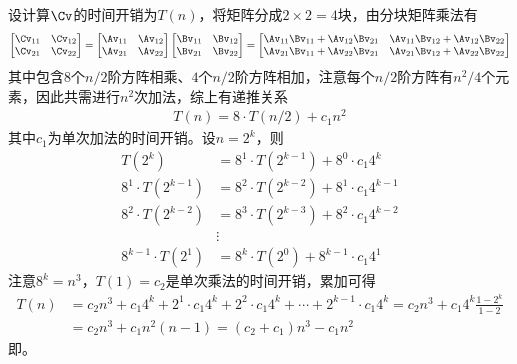\documentclass{ctexart}
\begin{document}
设计算$\Cv$的时间开销为$T(n)$，将矩阵分成$2 \times 2 = 4$块，由分块矩阵乘法有
\begin{align*}
    \begin{bmatrix}
        \Cv_{11} & \Cv_{12} \\ \Cv_{21} & \Cv_{22}
    \end{bmatrix} =
    \begin{bmatrix}
        \Av_{11} & \Av_{12} \\ \Av_{21} & \Av_{22}
    \end{bmatrix}
    \begin{bmatrix}
        \Bv_{11} & \Bv_{12} \\ \Bv_{21} & \Bv_{22}
    \end{bmatrix} =
    \begin{bmatrix}
        \Av_{11} \Bv_{11} + \Av_{12} \Bv_{21} & \Av_{11} \Bv_{12} + \Av_{12} \Bv_{22} \\
        \Av_{21} \Bv_{11} + \Av_{22} \Bv_{21} & \Av_{21} \Bv_{12} + \Av_{22} \Bv_{22}
    \end{bmatrix}
\end{align*}
其中包含$8$个$n/2$阶方阵相乘、$4$个$n/2$阶方阵相加，注意每个$n/2$阶方阵有$n^2/4$个元素，因此共需进行$n^2$次加法，综上有递推关系
\begin{align*}
    T(n) = 8 \cdot T(n/2) + c_1 n^2
\end{align*}
其中$c_1$为单次加法的时间开销。设$n = 2^k$，则
\begin{align*}
    T(2^k)               & = 8^1 \cdot T(2^{k-1}) + 8^0 \cdot c_1 4^k     \\
    8^1 \cdot T(2^{k-1}) & = 8^2 \cdot T(2^{k-2}) + 8^1 \cdot c_1 4^{k-1} \\
    8^2 \cdot T(2^{k-2}) & = 8^3 \cdot T(2^{k-3}) + 8^2 \cdot c_1 4^{k-2} \\
                         & \vdots                                         \\
    8^{k-1} \cdot T(2^1) & = 8^k \cdot T(2^0) + 8^{k-1} \cdot c_1 4^1
\end{align*}
注意$8^k = n^3$，$T(1) = c_2$是单次乘法的时间开销，累加可得
\begin{align*}
    T(n) & = c_2 n^3 + c_1 4^k + 2^1 \cdot c_1 4^k + 2^2 \cdot c_1 4^k + \cdots + 2^{k-1} \cdot c_1 4^k = c_2 n^3 + c_1 4^k \frac{1-2^k}{1-2} \\
         & = c_2 n^3 + c_1 n^2 (n-1) = (c_2 + c_1) n^3 - c_1 n^2
\end{align*}
即。
\end{document}
